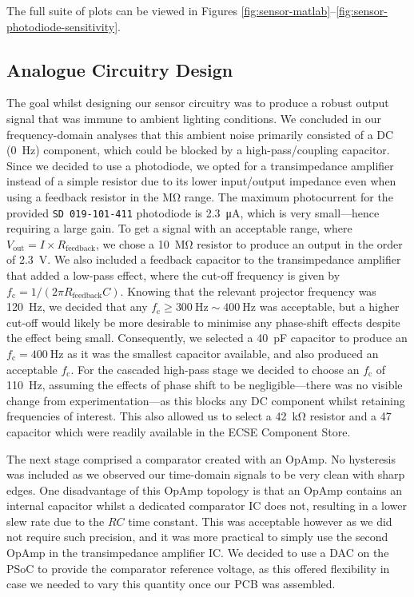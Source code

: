 \documentclass[conference]{IEEEtran}
\begin{document}
The full suite of plots can be viewed in Figures \ref{fig:sensor-matlab}–\ref{fig:sensor-photodiode-sensitivity}.

\subsection{Analogue Circuitry Design}

The goal whilst designing our sensor circuitry was to produce a robust output signal that was immune to ambient lighting conditions.
We concluded in our frequency-domain analyses that this ambient noise primarily consisted of a DC (\qty{0}{\hertz}) component, which could be blocked by a high-pass/coupling capacitor.
Since we decided to use a photodiode, we opted for a transimpedance amplifier instead of a simple resistor due to its lower input/output impedance even when using a feedback resistor in the \unit{\Mohm} range.
The maximum photocurrent for the provided \texttt{SD 019-101-411} photodiode is \qty{2.3}{\uA}, which is very small—hence requiring a large gain.
To get a signal with an acceptable range, where $V_\text{out} = I \times R_\text{feedback}$, we chose a \qty{10}{\Mohm} resistor to produce an output in the order of \qty{2.3}{\volt}.
We also included a feedback capacitor to the transimpedance amplifier that added a low-pass effect, where the cut-off frequency is given by $f_\text{c} = 1 / (2\pi R_\text{feedback}C)$.
Knowing that the relevant projector frequency was \qty{120}{\hertz}, we decided that any $f_\text{c}\geq \qty{300}{\hertz}\sim \qty{400}{\hertz}$ was acceptable, but a higher cut-off would likely be more desirable to minimise any phase-shift effects despite the effect being small.
Consequently, we selected a \qty{40}{\pF} capacitor to produce an $f_\text{c}=\qty{400}{\hertz}$ as it was the smallest capacitor available, and also produced an acceptable $f_\text{c}$.
For the cascaded high-pass stage we decided to choose an $f_\text{c}$ of \qty{110}{\hertz}, assuming the effects of phase shift to be negligible—there was no visible change from experimentation—as this blocks any DC component whilst retaining frequencies of interest.
This also allowed us to select a \qty{42}{\kohm} resistor and a \qty{47}{\uF} capacitor which were readily available in the ECSE Component Store.

The next stage comprised a comparator created with an OpAmp.
No hysteresis was included as we observed our time-domain signals to be very clean with sharp edges.
One disadvantage of this OpAmp topology is that an OpAmp contains an internal capacitor whilst a dedicated comparator IC does not, resulting in a lower slew rate due to the $RC$ time constant.
This was acceptable however as we did not require such precision, and it was more practical to simply use the second OpAmp in the transimpedance amplifier IC.
We decided to use a DAC on the PSoC to provide the comparator reference voltage, as this offered flexibility in case we needed to vary this quantity once our PCB was assembled.
\end{document}
